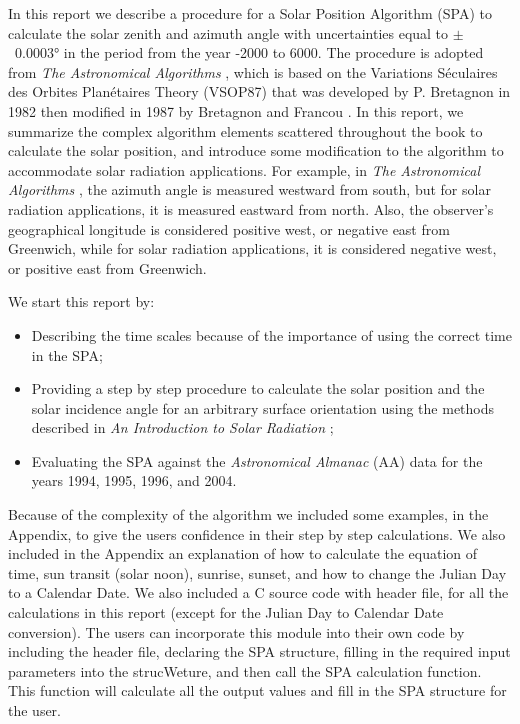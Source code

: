 \documentclass{article}
\begin{document}
\par In this report we describe a procedure for a Solar Position
Algorithm (SPA) to calculate the solar zenith and azimuth angle with
uncertainties equal to $\pm$~\ang{0.0003} in the period from the year
-2000 to 6000. The procedure is adopted from \textit{The Astronomical
  Algorithms} \cite{meeus}, which is based on the Variations
Séculaires des Orbites Planétaires Theory (VSOP87) that was developed
by P. Bretagnon in 1982 then modified in 1987 by Bretagnon and Francou
\cite{meeus}. In this report, we summarize the complex algorithm
elements scattered throughout the book to calculate the solar
position, and introduce some modification to the algorithm to
accommodate solar radiation applications. For example, in \textit{The
  Astronomical Algorithms} \cite{meeus}, the azimuth angle is measured
westward from south, but for solar radiation applications, it is
measured eastward from north. Also, the observer’s geographical
longitude is considered positive west, or negative east from
Greenwich, while for solar radiation applications, it is considered
negative west, or positive east from Greenwich.\\ %

\par We start this report by:
\begin{itemize}
\item Describing the time scales because of the importance of using
  the correct time in the SPA;
\item Providing a step by step procedure to calculate the solar
  position and the solar incidence angle for an arbitrary surface
  orientation using the methods described in \textit{An Introduction
    to Solar Radiation} \cite{iqbal};
\item Evaluating the SPA against the \textit{Astronomical Almanac}
  (AA) data for the years 1994, 1995, 1996, and 2004.
\end{itemize}

\par Because of the complexity of the algorithm we included some
examples, in the Appendix, to give the users confidence in their step
by step calculations. We also included in the Appendix an explanation
of how to calculate the equation of time, sun transit (solar noon),
sunrise, sunset, and how to change the Julian Day to a Calendar
Date. We also included a C source code with header file, for all the
calculations in this report (except for the Julian Day to Calendar
Date conversion). The users can incorporate this module into their own
code by including the header file, declaring the SPA structure,
filling in the required input parameters into the strucWeture, and
then call the SPA calculation function. This function will calculate
all the output values and fill in the SPA structure for the user.\\ %
\end{document}
